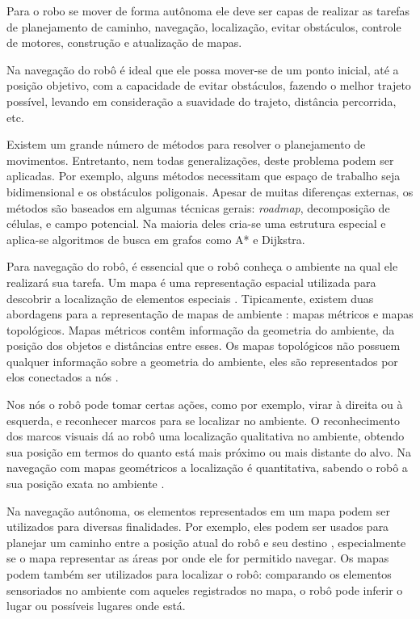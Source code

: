 \documentclass[12pt]{article}
\begin{document}
Para o robo se mover de forma autônoma ele deve ser capas de realizar as tarefas de planejamento de caminho, navegação, localização, 
evitar obstáculos, controle de motores, construção e atualização de mapas.

	Na navegação do robô é ideal que ele possa mover-se de um ponto inicial, até a posição objetivo, com a capacidade de evitar obstáculos, 
	fazendo o melhor trajeto possível, levando em consideração a suavidade do trajeto, distância percorrida, etc.
	
	Existem um grande número de métodos para resolver o planejamento de movimentos. Entretanto, nem todas generalizações,
	deste problema podem ser aplicadas. Por exemplo, alguns métodos necessitam que espaço de trabalho seja bidimensional e os obstáculos poligonais.
	Apesar de muitas diferenças externas, os métodos são baseados em algumas técnicas gerais: \textit{roadmap}, decomposição de células,
	 e campo potencial. Na maioria deles cria-se uma estrutura especial e aplica-se algoritmos de 
	 busca em grafos como A*\cite{dlite} e Dijkstra\cite{voronoi}.

	Para navegação do robô, é essencial que o robô conheça o ambiente na qual ele realizará sua tarefa. 
Um mapa é uma representação espacial utilizada para descobrir a localização de elementos especiais \cite{construcaoMapas2}.
Tipicamente, existem duas abordagens para a representação de mapas de ambiente \cite{construcaoMapas}:
 mapas métricos e mapas topológicos. Mapas métricos contêm informação da
 geometria do ambiente, da posição dos objetos e distâncias entre esses. Os mapas
topológicos não possuem qualquer informação sobre a geometria do ambiente, eles são
representados por elos conectados a nós \cite{construcaoMapas}. 

	Nos nós o robô pode tomar certas ações, como por
exemplo, virar à direita ou à esquerda, e reconhecer marcos para se localizar no ambiente. 
O reconhecimento dos marcos visuais dá ao robô uma localização qualitativa no ambiente,
obtendo sua posição em termos do quanto está mais próximo ou mais distante do alvo. Na
navegação com mapas geométricos a localização é quantitativa, sabendo o robô a sua posição
exata no ambiente \cite{construcaoMapas}.

	Na navegação autônoma, os elementos representados em um mapa podem ser utilizados para diversas finalidades. Por exemplo,
eles podem ser usados para planejar um caminho entre a posição atual do robô e seu
destino \cite{cnn}, especialmente se o mapa representar as áreas por onde ele for permitido navegar. Os mapas podem também ser
utilizados para localizar o robô: comparando os elementos sensoriados no ambiente com aqueles registrados no mapa, o robô pode
inferir o lugar ou possíveis lugares onde está.
	
\end{document}
